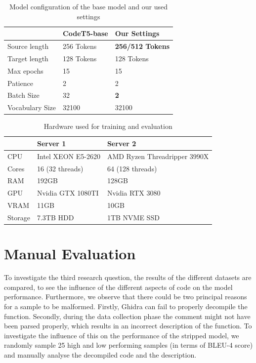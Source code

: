\label{tab:modelSettings}
\begin{table}[!h]
\centering
\begin{tabular}{l|ll}
\hline
                & CodeT5-base & Our Settings            \\ \hline
Source length   & 256 Tokens  & \textbf{256/512 Tokens} \\
Target length   & 128 Tokens  & 128 Tokens              \\
Max epochs      & 15          & 15                      \\
Patience        & 2           & 2                       \\
Batch Size      & 32          & \textbf{2}              \\
Vocabulary Size & 32100       & 32100                  
\end{tabular}
\caption{Model configuration of the base model and our used settings}
\end{table}

\label{tab:server}
\begin{table}[!h]
\centering
\begin{tabular}{l|ll}
\hline
        & Server 1           & Server 2                     \\ \hline
CPU     & Intel XEON E5-2620 & AMD Ryzen Threadripper 3990X \\
Cores   & 16 (32 threads)    & 64 (128 threads)             \\
RAM     & 192GB              & 128GB                        \\
GPU     & Nvidia GTX 1080TI  & Nvidia RTX 3080              \\
VRAM    & 11GB               & 10GB                         \\
Storage & 7.3TB HDD          & 1TB NVME SSD                
\end{tabular}
\caption{Hardware used for training and evaluation}
\end{table}

\section{Manual Evaluation}
To investigate the third research question, the results of the different datasets are compared, to see the influence of the different aspects of code on the model performance. Furthermore, we observe that there could be two principal reasons for a sample to be malformed. Firstly, Ghidra can fail to properly decompile the function. Secondly, during the data collection phase the comment might not have been parsed properly, which results in an incorrect description of the function. To investigate the influence of this on the performance of the stripped model, we randomly sample 25 high and low performing samples (in terms of BLEU-4 score) and manually analyse the decompiled code and the description. 

